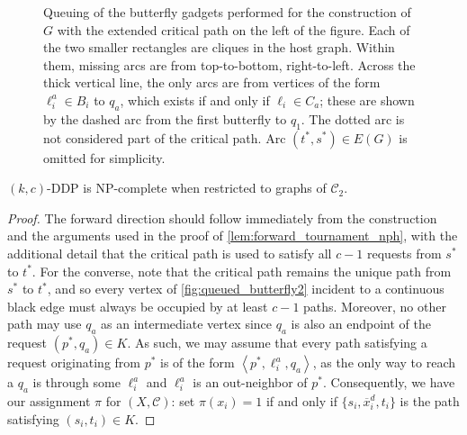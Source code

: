 \documentclass[a4paper,UKenglish,cleveref, autoref, thm-restate]{lipics-v2021}
\renewcommand{\NP}{{\sf NP}\xspace}
\newcommand{\angled}[1]{\left\langle{#1}\right\rangle}
\newcommand{\pname}[1]{{\sc #1}}
\newcommand{\ol}[1]{\overline{#1}}
\newcommand{\congestion}{c}
\begin{document}
\begin{figure}[!htb]
  \caption{Queuing of the butterfly gadgets performed for the construction of $G$ with
    the extended critical path on the left of the figure. Each of the two smaller
    rectangles are cliques in the host graph. Within them, missing arcs are from
    top-to-bottom, right-to-left. Across the thick vertical line, the only arcs are from vertices
    of the form $\ell^a_i \in B_i$ to $q_a$, which exists if and only if $\ell_i \in
    C_a$; these are shown by the dashed arc from the first butterfly to $q_1$. The dotted
    arc is not considered part of the critical path. Arc $(t^*, s^*) \in E(G)$ is omitted
    for simplicity.
  \label{fig:queued_butterfly2}}
\end{figure}

\begin{theorem}
  \label{thm:c2_hardness}
  \pname{$(k,c)$-DDP} is \NP-complete when restricted to graphs of
  $\mathcal{C}_2$.
\end{theorem}

\begin{proof}
  The forward direction should follow immediately from the construction and the arguments
  used in the proof of \autoref{lem:forward_tournament_nph}, with the additional detail
  that the critical path is used to satisfy all $\congestion-1$ requests from $s^*$ to $t^*$.
  For the converse, note that the critical path remains the unique path from $s^*$ to
  $t^*$, and so every vertex of \autoref{fig:queued_butterfly2} incident to a
  continuous black edge must always be occupied by at least $\congestion-1$ paths.
  Moreover, no other path may use $q_a$ as an intermediate vertex since $q_a$ is also an
  endpoint of the request $(p^*, q_a) \in K$.
  As such, we may assume that every path satisfying a request originating from $p^*$ is
  of the form $\angled{p^*, \ell^a_i, q_a}$, as the only way to reach a $q_a$ is through
  some $\ell^a_i$ and $\ell^a_i$ is an out-neighbor of $p^*$.
  Consequently, we have our
  assignment $\pi$ for $(X, \mathcal{C})$: set $\pi(x_i) = 1$ if and only if $\{s_i,
  \ol{x}^d_i, t_i\}$ is the path satisfying $(s_i, t_i) \in K$.
\end{proof}
\end{document}
